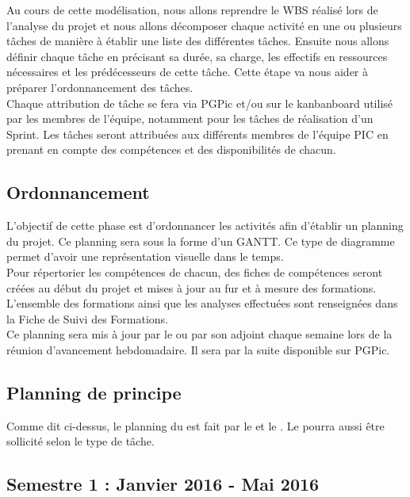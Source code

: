 Au cours de cette modélisation, nous allons reprendre le WBS réalisé lors de l’analyse du projet et nous allons décomposer chaque activité en une ou plusieurs tâches de manière à établir une liste des différentes tâches. Ensuite nous allons définir chaque tâche en précisant sa durée, sa charge, les effectifs en ressources nécessaires et les prédécesseurs de cette tâche. Cette étape va nous aider à préparer l’ordonnancement des tâches.\\

Chaque attribution de tâche se fera via PGPic et/ou sur le kanbanboard utilisé par les membres de l'équipe, notamment pour les tâches de réalisation d’un Sprint. Les tâches seront attribuées aux différents membres de l’équipe PIC en prenant en compte des compétences et des disponibilités de chacun.

\subsection{Ordonnancement}
\label{ordonnancement}

L'objectif de cette phase est d'ordonnancer les activités afin d'établir un planning du projet. Ce planning sera sous la forme d'un GANTT. Ce type de diagramme permet d’avoir une représentation visuelle dans le temps.\\

Pour répertorier les compétences de chacun, des fiches de compétences seront créées au début du projet et mises à jour au fur et à mesure des formations. L’ensemble des formations ainsi que les analyses effectuées sont renseignées dans la Fiche de Suivi des Formations.\\ 

Ce planning sera mis à jour par le \CP{}  ou par son adjoint chaque semaine lors de la réunion d’avancement hebdomadaire. Il sera par la suite disponible sur PGPic.


\subsection{Planning de principe}
\label{planning_de_principe}

Comme dit ci-dessus, le planning du \PICCourt est fait par le \CP{}  et le \CPA{}. Le \RD{}  pourra aussi être sollicité selon le type de tâche.

\subsection*{Semestre 1 : Janvier 2016 - Mai 2016}


